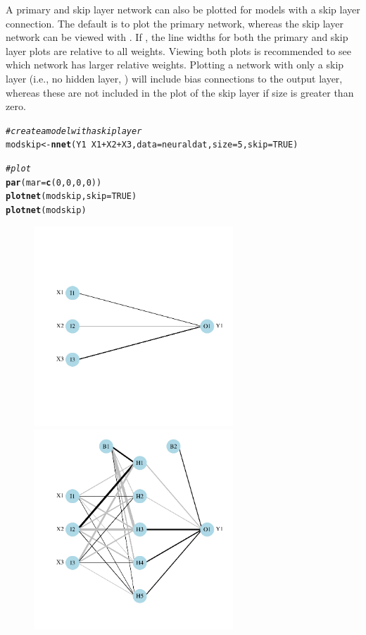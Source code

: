 \documentclass[article,shortnames]{jss}\usepackage[]{graphicx}\usepackage[]{color}
\makeatletter
\newcommand{\hlnum}[1]{\textcolor[rgb]{0.686,0.059,0.569}{#1}}%
\newcommand{\hlcom}[1]{\textcolor[rgb]{0.678,0.584,0.686}{\textit{#1}}}%
\newcommand{\hlopt}[1]{\textcolor[rgb]{0,0,0}{#1}}%
\newcommand{\hlstd}[1]{\textcolor[rgb]{0.345,0.345,0.345}{#1}}%
\newcommand{\hlkwb}[1]{\textcolor[rgb]{0.69,0.353,0.396}{#1}}%
\newcommand{\hlkwc}[1]{\textcolor[rgb]{0.333,0.667,0.333}{#1}}%
\newcommand{\hlkwd}[1]{\textcolor[rgb]{0.737,0.353,0.396}{\textbf{#1}}}%
\newenvironment{kframe}{%
 \def\at@end@of@kframe{}%
 \ifinner\ifhmode%
  \def\at@end@of@kframe{\end{minipage}}%
  \begin{minipage}{\columnwidth}%
 \fi\fi%
 \def\FrameCommand##1{\hskip\@totalleftmargin \hskip-\fboxsep
 \colorbox{shadecolor}{##1}\hskip-\fboxsep
     \hskip-\linewidth \hskip-\@totalleftmargin \hskip\columnwidth}%
 \MakeFramed {\advance\hsize-\width
   \@totalleftmargin\z@ \linewidth\hsize
   \@setminipage}}%
 {\par\unskip\endMakeFramed%
 \at@end@of@kframe}
\newenvironment{knitrout}{}{} %
\makeatother
\begin{document}
A primary and skip layer network can also be plotted for  models with a skip layer connection. The default is to plot the primary network, whereas the skip layer network can be viewed with . If , the line widths for both the primary and skip layer plots are relative to all weights. Viewing both plots is recommended to see which network has larger relative weights. Plotting a network with only a skip layer (i.e., no hidden layer, ) will include bias connections to the output layer, whereas these are not included in the plot of the skip layer if size is greater than zero.

\begin{knitrout}
\color{fgcolor}\begin{kframe}
\begin{alltt}
\hlcom{# create a model with a skip layer}
\hlstd{modskip} \hlkwb{<-} \hlkwd{nnet}\hlstd{(Y1} \hlopt{~} \hlstd{X1} \hlopt{+} \hlstd{X2} \hlopt{+} \hlstd{X3,} \hlkwc{data} \hlstd{= neuraldat,} \hlkwc{size} \hlstd{=} \hlnum{5}\hlstd{,} \hlkwc{skip} \hlstd{=} \hlnum{TRUE}\hlstd{)}

\hlcom{# plot}
\hlkwd{par}\hlstd{(}\hlkwc{mar} \hlstd{=} \hlkwd{c}\hlstd{(}\hlnum{0}\hlstd{,} \hlnum{0}\hlstd{,} \hlnum{0}\hlstd{,} \hlnum{0}\hlstd{))}
\hlkwd{plotnet}\hlstd{(modskip,} \hlkwc{skip} \hlstd{=} \hlnum{TRUE}\hlstd{)}
\hlkwd{plotnet}\hlstd{(modskip)}
\end{alltt}
\end{kframe}\begin{figure}[!ht]

{\centering \includegraphics[width=7.5cm,height=7.5cm]{figs/plotnet_skip-1} 
\includegraphics[width=7.5cm,height=7.5cm]{figs/plotnet_skip-2} 

}
\end{figure}
\end{knitrout}
\end{document}
